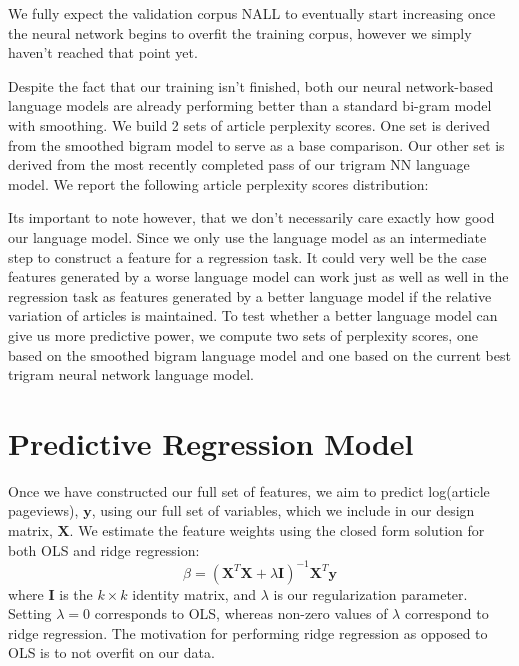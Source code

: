 \documentclass[fleqn,12pt]{SelfArx} %
\begin{document}
 
We fully expect the validation corpus NALL to eventually start increasing once the neural network begins to overfit the training corpus, however we simply haven't reached that point yet. 
 
Despite the fact that our training isn't finished, both our neural network-based language models are already performing better than a standard bi-gram model with smoothing. We build 2 sets of article perplexity scores. One set is derived from the smoothed bigram model to serve as a base comparison. Our other set is derived from the most recently completed pass of our trigram NN language model. We report the following article perplexity scores distribution:

%


%

Its important to note however, that we don't necessarily care exactly how good our language model. Since we only use the language model as an intermediate step to construct a feature for a regression task. It could very well be the case features generated by a worse language model can work just as well as well in the regression task as features generated by a better language model if the relative variation of articles is maintained. To test whether a better language model can give us more predictive power, we compute two sets of perplexity scores, one based on the smoothed bigram language model and one based on the current best trigram neural network language model. 


\section{Predictive Regression Model}

Once we have constructed our full set of features, we aim to predict log(article pageviews), $\mathbf{y}$, using our full set of variables, which we include in our design matrix, $\mathbf{X}$. We estimate the feature weights using the closed form solution for both OLS and ridge regression:
\begin{equation}
\beta = (\mathbf{X}^T\mathbf{X} + \lambda \mathbf{I})^{-1}\mathbf{X}^T\mathbf{y}
\end{equation}
where $\mathbf{I}$ is the $k \times k$ identity matrix, and $\lambda$ is our regularization parameter. Setting $\lambda = 0$ corresponds to OLS, whereas non-zero values of $\lambda$ correspond to ridge regression. The motivation for performing ridge regression as opposed to OLS is to not overfit on our data. 
\end{document}
